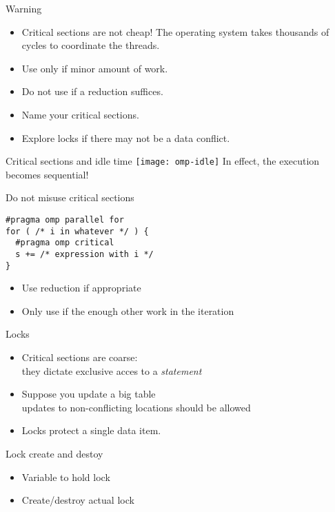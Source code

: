 \begin{numberedframe}{Warning}
  \begin{itemize}
  \item Critical sections are not cheap! The operating system takes
    thousands of cycles to coordinate the threads.
  \item Use only if minor amount of work.
  \item Do not use if a reduction suffices.
  \item Name your critical sections.
  \item Explore locks if there may not be a data conflict.
  \end{itemize}
\end{numberedframe}

\begin{numberedframe}{Critical sections and idle time}
    \texttt{[image: omp-idle]}
    In effect, the execution becomes sequential!
\end{numberedframe}

\begin{numberedframe}{Do not misuse critical sections}
\begin{lstlisting}
#pragma omp parallel for
for ( /* i in whatever */ ) {
  #pragma omp critical
  s += /* expression with i */
}
\end{lstlisting}
  \begin{itemize}
  \item Use reduction if appropriate
  \item Only use if the enough other work in the iteration
  \end{itemize}
\end{numberedframe}

\begin{numberedframe}{Locks}
  \begin{itemize}
  \item Critical sections are coarse:\\
    they dictate exclusive acces to a \emph{statement}
  \item     Suppose you update a big table\\
    updates to non-conflicting locations should be allowed
  \item Locks protect a single data item.
  \end{itemize}
\end{numberedframe}

\begin{numberedframe}{Lock create and destoy}
  \begin{itemize}
  \item Variable to hold lock
  \item Create/destroy actual lock
  \end{itemize}
\end{numberedframe}

